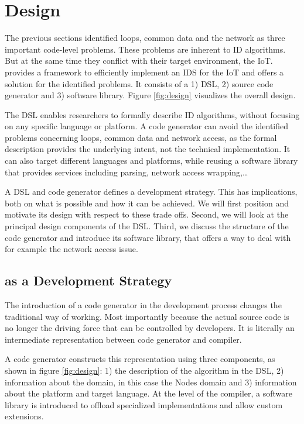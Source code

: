 \documentclass[conference]{IEEEtran}
\begin{document}
\section{Design}
\label{design}

The previous sections identified loops, common data and the network as three
important code-level problems. These problems are inherent to ID algorithms.
But at the same time they conflict with their target environment, the IoT\@.
\NAME provides a framework to efficiently implement an IDS for the IoT and
offers a solution for the identified problems. It consists of a 1) DSL, 2)
source code generator and 3) software library. Figure \ref{fig:design}
visualizes the overall design.


The DSL enables researchers to formally describe ID algorithms, without
focusing on any specific language or platform. A code generator can avoid the
identified problems concerning loops, common data and network access, as the
formal description provides the underlying intent, not the technical
implementation. It can also target different languages and platforms, while
reusing a software library that provides services including parsing, network
access wrapping,\dots

A DSL and code generator defines a development strategy. This has implications,
both on what is possible and how it can be achieved. We will first position
\NAME and motivate its design with respect to these trade offs. Second, we will
look at the principal design components of the DSL. Third, we discuss the
structure of the code generator and introduce its software library, that offers
a way to deal with for example the network access issue.

\subsection{\NAME as a Development Strategy}
\label{positioning}

The introduction of a code generator in the development process changes the
traditional way of working. Most importantly because the actual source code is
no longer the driving force that can be controlled by developers. It is
literally an intermediate representation between code generator and compiler.

A code generator constructs this representation using three components, as
shown in figure \ref{fig:design}: 1) the description of the algorithm in the
DSL, 2) information about the domain, in this case the Nodes domain and 3)
information about the platform and target language. At the level of the
compiler, a software library is introduced to offload specialized
implementations and allow custom extensions.
\end{document}
